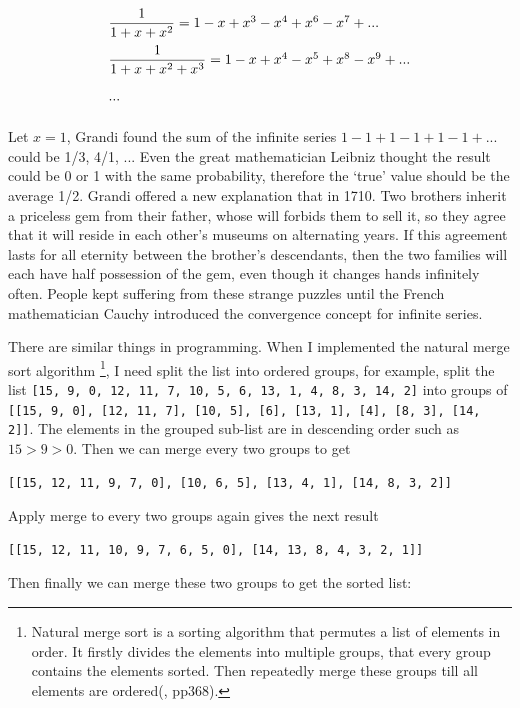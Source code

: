 \documentclass{article}
\begin{document}
\[
\def\arraystretch{2.2}
\begin{array}{l}
\dfrac{1}{1 + x + x^2} = 1 - x + x^3 - x^4 + x^6 - x^7 + ... \\%
\dfrac{1}{1 + x + x^2 + x^3} = 1 - x + x^4 - x^5 + x^8 - x^9 + ... \\
...
\end{array}
\]

Let $x = 1$, Grandi found the sum of the infinite series $1 - 1 + 1 - 1 + 1 - 1 + ...$ could be 1/3, 4/1, ... Even the great mathematician Leibniz thought the result could be 0 or 1 with the same probability, therefore the `true' value should be the average 1/2. Grandi offered a new explanation that in 1710. Two brothers inherit a priceless gem from their father, whose will forbids them to sell it, so they agree that it will reside in each other's museums on alternating years. If this agreement lasts for all eternity between the brother's descendants, then the two families will each have half possession of the gem, even though it changes hands infinitely often\cite{HanXueTao16}. People kept suffering from these strange puzzles until the French mathematician Cauchy introduced the convergence concept for infinite series.

There are similar things in programming. When I implemented the natural merge sort algorithm \footnote{Natural merge sort is a sorting algorithm that permutes a list of elements in order. It firstly divides the elements into multiple groups, that every group contains the elements sorted. Then repeatedly merge these groups till all elements are ordered(\cite{LiuXinyu2017}, pp368).}, I need split the list into ordered groups, for example, split the list \texttt{[15, 9, 0, 12, 11, 7, 10, 5, 6, 13, 1, 4, 8, 3, 14, 2]} into groups of \texttt{[[15, 9, 0], [12, 11, 7], [10, 5], [6], [13, 1], [4], [8, 3], [14, 2]]}. The elements in the grouped sub-list are in descending order such as $15 > 9 > 0$. Then we can merge every two groups to get

\begin{verbatim}
[[15, 12, 11, 9, 7, 0], [10, 6, 5], [13, 4, 1], [14, 8, 3, 2]]
\end{verbatim}

Apply merge to every two groups again gives the next result

\begin{verbatim}
[[15, 12, 11, 10, 9, 7, 6, 5, 0], [14, 13, 8, 4, 3, 2, 1]]
\end{verbatim}

Then finally we can merge these two groups to get the sorted list:
\end{document}
